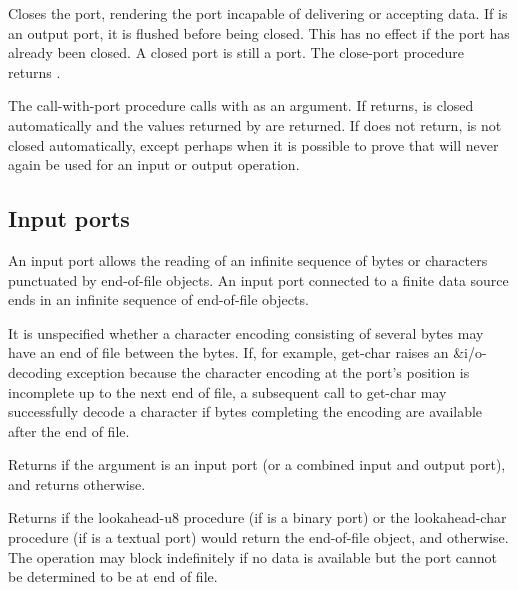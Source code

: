 \begin{entry}{%
}
   
Closes the port, rendering the port incapable of delivering or
accepting data. If  is an output port, it is flushed before
being closed.  This has no effect if the port has already been closed.
A closed port is still a port.  The {\cf close-port} procedure returns
\unspecifiedreturn.
\end{entry}

\begin{entry}{%
}
   
The {\cf call-with-port} procedure
calls  with  as an argument. If
 returns,  is closed automatically and
the values returned by  are returned. If  does not
return,  is not closed automatically, except perhaps when it is
possible to prove that  will never again be used for an
input or output operation.
\end{entry}

\subsection{Input ports}

An input port allows the reading of an infinite sequence of bytes
or characters punctuated
by end-of-file objects. An input port connected to a finite data
source ends in an infinite sequence of end-of-file objects.

It is unspecified whether a character encoding consisting of several
bytes may have an end of file between the bytes.  If, for example,
{\cf get-char} raises an {\cf\&i/o-decoding} exception because the
character encoding at the port's position is incomplete up to the next
end of file, a subsequent call to {\cf get-char} may successfully
decode a character if bytes completing the encoding are available
after the end of file.

\begin{entry}{%
}

Returns \schtrue{} if the argument is an input port (or a combined input
and output port), and returns \schfalse{} otherwise.
\end{entry}

\begin{entry}{%
}
   
Returns \schtrue{}
if the {\cf lookahead-u8} procedure (if  is a binary port)
or the {\cf lookahead-char} procedure (if  is a textual port)
would return
the end-of-file object, and \schfalse{} otherwise.
The operation may block indefinitely if no data is available
but the port cannot be determined to be at end of file.
\end{entry}

